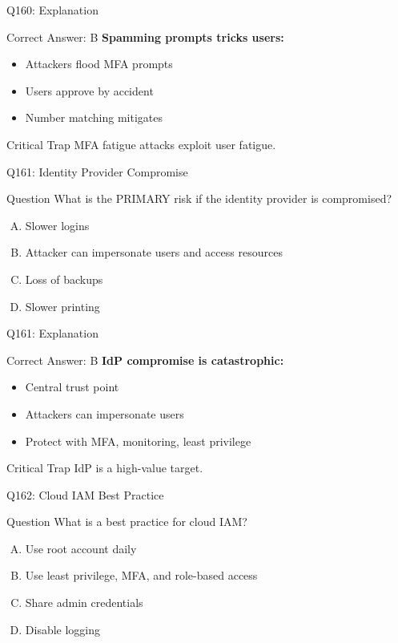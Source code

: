 \documentclass{beamer}
\begin{document}
	\begin{frame}{Q160: Explanation}
		\begin{block}{Correct Answer: B}
			\textbf{Spamming prompts tricks users:}
			\begin{itemize}
				\item Attackers flood MFA prompts
				\item Users approve by accident
				\item Number matching mitigates
			\end{itemize}
		\end{block}
		\begin{alertblock}{Critical Trap}
			MFA fatigue attacks exploit user fatigue.
		\end{alertblock}
	\end{frame}
	
	\begin{frame}{Q161: Identity Provider Compromise}
		\begin{block}{Question}
			What is the PRIMARY risk if the identity provider is compromised?
		\end{block}
		\begin{enumerate}[(A)]
			\item Slower logins
			\item Attacker can impersonate users and access resources
			\item Loss of backups
			\item Slower printing
		\end{enumerate}
	\end{frame}
	
	\begin{frame}{Q161: Explanation}
		\begin{block}{Correct Answer: B}
			\textbf{IdP compromise is catastrophic:}
			\begin{itemize}
				\item Central trust point
				\item Attackers can impersonate users
				\item Protect with MFA, monitoring, least privilege
			\end{itemize}
		\end{block}
		\begin{alertblock}{Critical Trap}
			IdP is a high-value target.
		\end{alertblock}
	\end{frame}
	
	\begin{frame}{Q162: Cloud IAM Best Practice}
		\begin{block}{Question}
			What is a best practice for cloud IAM?
		\end{block}
		\begin{enumerate}[(A)]
			\item Use root account daily
			\item Use least privilege, MFA, and role-based access
			\item Share admin credentials
			\item Disable logging
		\end{enumerate}
	\end{frame}
	
\end{document}
